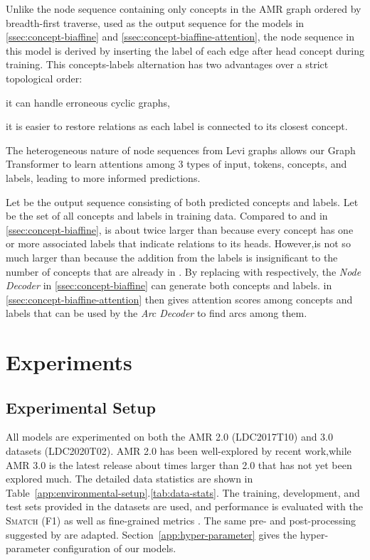 \documentclass[11pt,a4paper]{article}
\newcommand{\LN}{\linebreak\noindent}    \newcommand{\textsec}[1]{\textsection\ref{#1}}
\begin{document}
Unlike the node sequence containing only concepts in the AMR graph ordered by breadth-first traverse, used as the output sequence for the models in \textsec{ssec:concept-biaffine} and \textsec{ssec:concept-biaffine-attention}, the node sequence in this model is derived by inserting the label of each edge after head concept during training. This concepts-labels alternation has two advantages over a strict topological order:
\begin{inparaenum}[(i)]
\item it can handle erroneous cyclic graphs,
\item it is easier to restore relations as each label is connected to its closest concept.
\end{inparaenum}
\noindent
The heterogeneous nature of node sequences from Levi graphs allows our Graph Transformer to learn attentions among 3 types of input, tokens, concepts, and labels, leading to more informed predictions.

Let  be the output sequence consisting of both predicted concepts and labels.
Let  be the set of all concepts and labels in training data.
Compared to  and  in \textsec{ssec:concept-biaffine},  is about twice larger than  because every concept has one or more associated labels that indicate relations to its heads.
However,\LN  is not so much larger than  because the addition from the labels is insignificant to the number of concepts that are already in . By replacing  with  respectively, the \textit{Node Decoder} in \textsec{ssec:concept-biaffine} can generate both concepts and labels.
 in \textsec{ssec:concept-biaffine-attention} then gives attention scores among concepts and labels that can be used by the \textit{Arc Decoder} to find arcs among them.
 \section{Experiments}
\label{sec:experiments}

\subsection{Experimental Setup}

All models are experimented on both the AMR 2.0 (LDC2017T10) and 3.0 datasets (LDC2020T02).
AMR 2.0 has been well-explored by recent work,\LN while AMR 3.0 is the latest release about  times larger than 2.0 that has not yet been explored much.
The detailed data statistics are shown in Table~\ref{app:environmental-setup}.\ref{tab:data-stats}.
The training, development, and test sets provided in the datasets are used, and performance is evaluated with the \textsc{Smatch} (F1) \cite{cai2013smatch} as well as fine-grained metrics \cite{damonte-etal-2017-incremental}.
The same pre- and post-processing suggested by\LN {} are adapted.
Section~\ref{app:hyper-parameter} gives the hyper-parameter configuration of our models.
\end{document}
